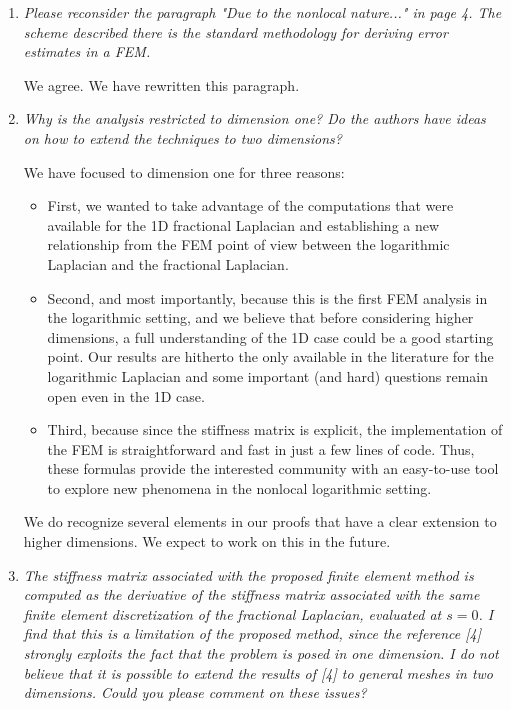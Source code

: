 \documentclass[11 pt]{article}
\numberwithin{equation}{section}
\begin{document}
\begin{enumerate}
 \item
\emph{
Please reconsider the paragraph "Due to the nonlocal nature..." in page 4. The scheme described there is the standard methodology for deriving error estimates in a FEM.
}

We agree.  We have rewritten this paragraph.

\item \emph{
 Why is the analysis restricted to dimension one? Do the authors have ideas on how to extend the techniques to two dimensions?
}

We have focused to dimension one for three reasons:
\begin{itemize}
 \item First, we wanted to take advantage of the computations that were available for the 1D fractional Laplacian and establishing a new relationship from the FEM point of view between the logarithmic Laplacian and the fractional Laplacian.
 \item  Second, and most importantly, because this is the first FEM analysis in the logarithmic setting, and we believe that before considering higher dimensions, a full understanding of the 1D case could be a good starting point.  Our results are hitherto the only available in the literature for the logarithmic Laplacian and some important (and hard) questions remain open even in the 1D case.
 \item Third, because since the stiffness matrix is explicit, the implementation of the FEM is straightforward and fast in just a few lines of code. Thus, these formulas provide the interested community with an easy-to-use tool to explore new phenomena in the nonlocal logarithmic setting.
\end{itemize}


We do recognize several elements in our proofs that have a clear extension to higher dimensions. We expect to work on this in the future.


\item \emph{
 The stiffness matrix associated with the proposed finite element method is computed as the derivative of the stiffness matrix associated with the same finite element discretization of the fractional Laplacian, evaluated at $s=0$. I find that this is a limitation of the proposed method, since the reference [4] strongly exploits the fact that the problem is posed in one dimension. I do not believe that it is possible to extend the results of [4] to general meshes in two dimensions. Could you please comment on these issues?
}



\end{enumerate}
\end{document}

